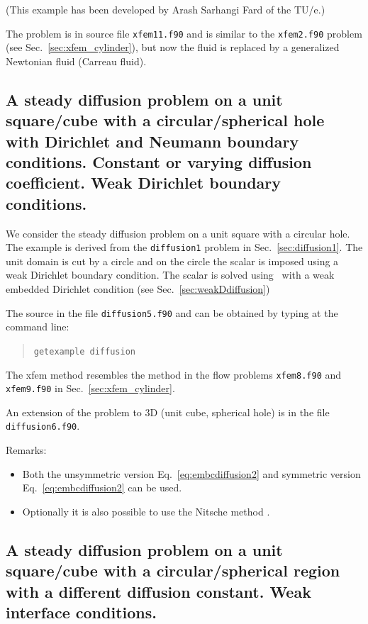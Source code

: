 (This example has been developed by Arash Sarhangi Fard of the TU/e.)

The problem is in source file \texttt{xfem11.f90} and
is similar to the \texttt{xfem2.f90} problem
(see Sec.~\ref{sec:xfem_cylinder}), but now the fluid is replaced by a
generalized Newtonian fluid (Carreau fluid).

\subsection{A steady diffusion problem on a unit square/cube
            with a circular/spherical hole
            with Dirichlet
            and Neumann boundary conditions. Constant or varying diffusion
            coefficient. Weak Dirichlet boundary conditions.}

\label{sec:diffusion5}

We consider the steady
diffusion problem
on a unit square with a circular hole. The example is derived from
the \texttt{diffusion1} problem in Sec.~\ref{sec:diffusion1}.
The unit domain is cut by a circle and on the circle the scalar is imposed
using a weak Dirichlet boundary condition. The scalar is solved using \xfem\
with a weak embedded Dirichlet condition (see Sec.~\ref{sec:weakDdiffusion})

The source 
in the file \texttt{diffusion5.f90}
 and can be obtained by typing at the
command line:
\begin{quote}
   \texttt{getexample diffusion}
\end{quote}

The xfem method resembles the method in the flow problems
\texttt{xfem8.f90} and \texttt{xfem9.f90} in
Sec.~\ref{sec:xfem_cylinder}. 

An extension of the problem to 3D (unit cube, spherical hole)
is in the file \texttt{diffusion6.f90}.

Remarks:
\begin{itemize}
   \item Both the unsymmetric version Eq.~\eqref{eq:embcdiffusion2}
 and symmetric version Eq.~\eqref{eq:embcdiffusion2} can be used.
\item
Optionally it is also possible to use the
Nitsche method \cite{Nitsche71}.
\end{itemize}

\subsection{A steady diffusion problem on a unit square/cube
            with a circular/spherical region with a different diffusion
            constant. Weak interface conditions.}

